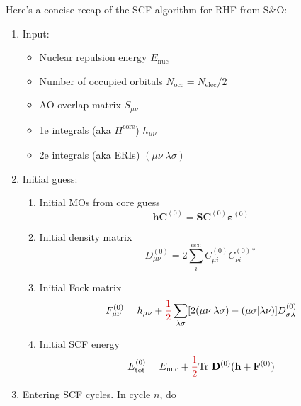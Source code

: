\documentclass[parskip=full]{article}
\newcommand{\myred}[1]{\textcolor{myred}{#1}}
\begin{document}
    Here's a concise recap of the SCF algorithm for RHF from S\&O:
    \begin{enumerate}
        \item Input:
            \begin{itemize}
                \item Nuclear repulsion energy $E_{\textrm{nuc}}$
                \item Number of occupied orbitals $N_{\textrm{occ}} = N_{\textrm{elec}} / 2$
                \item AO overlap matrix $S_{\mu\nu}$
                \item 1e integrals (aka $H^{\textrm{core}}$) $h_{\mu\nu}$
                \item 2e integrals (aka ERIs) $(\mu\nu|\lambda\sigma)$
            \end{itemize}
        \item Initial guess:
        \begin{enumerate}
            \item Initial MOs from core guess
            \begin{equation}
                \mathbf{h} \mathbf{C}^{(0)}
                    = \mathbf{S} \mathbf{C}^{(0)} \bm{\varepsilon}^{(0)}
            \end{equation}
            \item Initial density matrix
            \begin{equation}
                D^{(0)}_{\mu\nu}
                    = 2 \sum_{i}^{\textrm{occ}} C^{(0)}_{\mu i} C^{(0)*}_{\nu i}
            \end{equation}
            \item Initial Fock matrix
            \begin{equation}
                F^{(0)}_{\mu\nu}
                    = h_{\mu\nu} + \myred{\frac{1}{2}} \sum_{\lambda\sigma} [2 (\mu\nu|\lambda\sigma) - (\mu\sigma|\lambda\nu)]
                    D^{(0)}_{\sigma\lambda}
            \end{equation}
            \item Initial SCF energy
            \begin{equation}
                E^{(0)}_{\textrm{tot}}
                    = E_{\textrm{nuc}} + \myred{\frac{1}{2}} \mathrm{Tr}~\mathbf{D}^{(0)} (\mathbf{h} + \mathbf{F}^{(0)})
            \end{equation}
        \end{enumerate}
        \item Entering SCF cycles. In cycle $n$, do

\end{enumerate}
\end{document}
